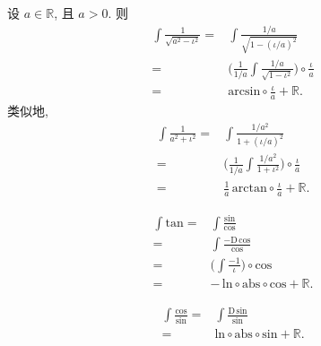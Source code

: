 \begin{example}
    设 $a \in \mathbb{R}$, 且 $a > 0$.
    则
    \begin{align*}
        \int {\frac{1}{\sqrt{a^2 - \iota^2}}}
        = {} & \int {\frac{1/a}{\sqrt{1 - (\iota/a)^2}}}                                               \\
        = {} & \Bigg( \frac{1}{1/a} \int {\frac{1/a}{\sqrt{1 - \iota^2}}} \Bigg) \circ \frac{\iota}{a} \\
        = {} & \mathrm{arcsin} \circ \frac{\iota}{a} + \mathbb{R}.
    \end{align*}
    类似地,
    \begin{align*}
        \int {\frac{1}{a^2 + \iota^2}}
        = {} & \int {\frac{1/a^2}{1 + (\iota/a)^2}}                                               \\
        = {} & \Bigg( \frac{1}{1/a} \int {\frac{1/a^2}{1 + \iota^2}} \Bigg) \circ \frac{\iota}{a} \\
        = {} & \frac{1}{a}\,\mathrm{arctan} \circ \frac{\iota}{a} + \mathbb{R}.
    \end{align*}
\end{example}

\begin{example}
    \begin{align*}
        \int {\mathrm{tan}}
        = {} & \int {\frac{\mathrm{sin}}{\mathrm{cos}}}                             \\
        = {} & \int {\frac{-\mathrm{D}\,\mathrm{cos}}{\mathrm{cos}}}                \\
        = {} & \Bigg( \int {\frac{-1}{\iota}} \Bigg) \circ \mathrm{cos}             \\
        = {} & {-\,\mathrm{ln}} \circ \mathrm{abs} \circ \mathrm{cos} + \mathbb{R}.
    \end{align*}
\end{example}

\begin{example}
    \begin{align*}
        \int {\frac{\mathrm{cos}}{\mathrm{sin}}}
        = {} & \int {\frac{\mathrm{D}\,\mathrm{sin}}{\mathrm{sin}}}            \\
        = {} & \mathrm{ln} \circ \mathrm{abs} \circ \mathrm{sin} + \mathbb{R}.
    \end{align*}
\end{example}

